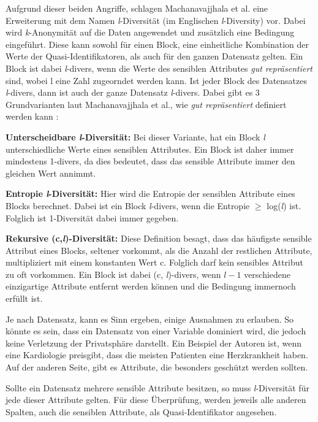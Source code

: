 Aufgrund dieser beiden Angriffe, schlagen Machanavajjhala et al. \cite{P-24} eine Erweiterung mit dem Namen \textit{l}-Diversität (im Englischen \textit{l}-Diversity) vor.
Dabei wird \textit{k}-Anonymität auf die Daten angewendet und zusätzlich eine Bedingung eingeführt. 
Diese kann sowohl für einen Block, eine einheitliche Kombination der Werte der Quasi-Identifikatoren, als auch für den ganzen Datensatz gelten.
Ein Block ist dabei \textit{l}-divers, wenn die Werte des sensiblen Attributes \textit{\dq gut repräsentiert\dq} sind, wobei l eine Zahl zugeorndet werden kann.
Ist jeder Block des Datensatzes \textit{l}-divers, dann ist auch der ganze Datensatz \textit{l}-divers.
Dabei gibt es 3 Grundvarianten laut Machanavajjhala et al., wie \textit{\dq gut repräsentiert\dq} definiert werden kann \cite{P-24}:
\begin{compactitem}
\item \textbf{Unterscheidbare \textit{l}-Diversität:} Bei dieser Variante, hat ein Block \textit{l} unterschiedliche Werte eines sensiblen Attributes. Ein Block ist daher immer mindestens 1-divers, da dies bedeutet, dass das sensible Attribute immer den gleichen Wert annimmt.
\item \textbf{Entropie \textit{l}-Diversität:} Hier wird die Entropie der sensiblen Attribute eines Blocks berechnet. Dabei ist ein Block \textit{l}-divers, wenn die Entropie $\ge$ log(\textit{l}) ist. Folglich ist 1-Diversität dabei immer gegeben.
\item \textbf{Rekursive (c,\textit{l})-Diversität:} Diese Definition besagt, dass das häufigste sensible Attribut eines Blocks, seltener vorkommt, als die Anzahl der restlichen Attribute, multipliziert mit einem konstanten Wert c. Folglich darf kein sensibles Attribut zu oft vorkommen. Ein Block ist dabei (c, \textit{l})-divers, wenn $\textit{l} - 1$ verschiedene einzigartige Attribute entfernt werden können und die Bedingung immernoch erfüllt ist.
\end{compactitem}

Je nach Datensatz, kann es Sinn ergeben, einige Ausnahmen zu erlauben.
So könnte es sein, dass ein Datensatz von einer Variable dominiert wird, die jedoch keine Verletzung der Privatsphäre darstellt. 
Ein Beispiel der Autoren ist, wenn eine Kardiologie preisgibt, dass die meisten Patienten eine Herzkrankheit haben.
Auf der anderen Seite, gibt es Attribute, die besonders geschützt werden sollten.

Sollte ein Datensatz mehrere sensible Attribute besitzen, so muss \textit{l}-Diversität für jede dieser Attribute gelten. 
Für diese Überprüfung, werden jeweils alle anderen Spalten, auch die sensiblen Attribute, als Quasi-Identifikator angesehen.

